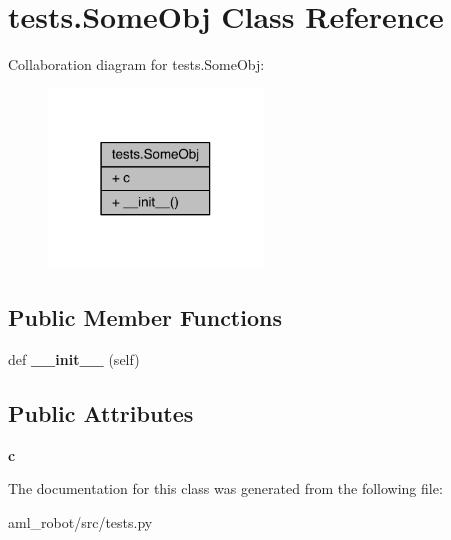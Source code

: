 \hypertarget{classtests_1_1_some_obj}{}\section{tests.\+Some\+Obj Class Reference}
\label{classtests_1_1_some_obj}


Collaboration diagram for tests.\+Some\+Obj\+:\nopagebreak
\begin{figure}[H]
\begin{center}
\leavevmode
\includegraphics[width=162pt]{classtests_1_1_some_obj__coll__graph}
\end{center}
\end{figure}
\subsection*{Public Member Functions}
\begin{DoxyCompactItemize}
\item 
\hypertarget{classtests_1_1_some_obj_a6bbab9d4ef4c83ef011a468be214639d}{}\label{classtests_1_1_some_obj_a6bbab9d4ef4c83ef011a468be214639d} 
def {\bfseries \+\_\+\+\_\+init\+\_\+\+\_\+} (self)
\end{DoxyCompactItemize}
\subsection*{Public Attributes}
\begin{DoxyCompactItemize}
\item 
\hypertarget{classtests_1_1_some_obj_ad442c35720f3dd0172c277d3bb4e9316}{}\label{classtests_1_1_some_obj_ad442c35720f3dd0172c277d3bb4e9316} 
{\bfseries c}
\end{DoxyCompactItemize}


The documentation for this class was generated from the following file\+:\begin{DoxyCompactItemize}
\item 
aml\+\_\+robot/src/tests.\+py\end{DoxyCompactItemize}
